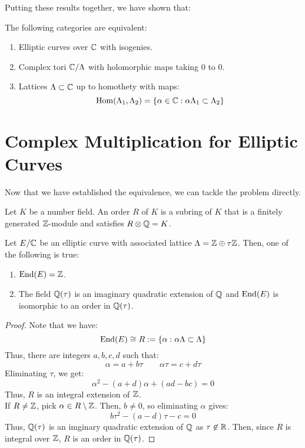 \documentclass[12pt]{article}
\begin{document}
Putting these results together, we have shown that:

\begin{theorem}
    The following categories are equivalent: 
    \begin{enumerate}
        \item Elliptic curves over $\mathbb C$ with isogenies.
        \item Complex tori $\mathbb C/\Lambda$ with holomorphic maps taking $0$ to $0$. 
        \item Lattices $\Lambda \subset \mathbb C$ up to homothety with maps:
        \[ \operatorname{Hom}(\Lambda_1, \Lambda_2) = \{\alpha \in \mathbb C: \alpha \Lambda_1 \subset \Lambda_2\}\]
    \end{enumerate}
\end{theorem}


\section{Complex Multiplication for Elliptic Curves}

Now that we have established the equivalence, we can tackle the problem directly.
\begin{definition}
    Let $K$ be a number field. An order $R$ of $K$ is a subring of $K$ that is a finitely generated $\mathbb Z$-module and satisfies $R \otimes \mathbb Q = K$. 
\end{definition}

\begin{prop}
    Let $E/\mathbb C$ be an elliptic curve with associated lattice $\Lambda = \mathbb Z \oplus \tau\mathbb Z$. Then, one of the following is true:
    \begin{enumerate}
        \item $\operatorname{End}(E) = \mathbb Z$. 
        \item The field $\mathbb Q(\tau)$ is an imaginary quadratic extension of $\mathbb Q$ and $\operatorname{End}(E)$ is isomorphic to an order in $\mathbb Q(\tau)$. 
    \end{enumerate}
\end{prop}
\begin{proof}
    Note that we have:
    \[ \operatorname{End}(E) \cong R := \{\alpha: \alpha \Lambda \subset \Lambda\}\]
    Thus, there are integers $a, b, c, d$ such that:
    \[ \alpha = a + b \tau \qquad \alpha\tau = c+d\tau\]
    Eliminating $\tau$, we get: 
    \[\alpha^2 - (a+d)\alpha + (ad-bc) = 0\]
    Thus, $R$ is an integral extension of $\mathbb Z$. \\
    If $R \ne \mathbb Z$, pick $\alpha \in R\setminus \mathbb Z$. Then, $b \neq 0$, so eliminating $\alpha$ gives: 
    \[ b\tau^2 - (a-d)\tau -c = 0\]
    Thus, $\mathbb Q(\tau)$ is an imginary quadratic extension of $\mathbb Q$ as $\tau \not \in \mathbb R$. Then, since $R$ is integral over $\mathbb Z$, $R$ is an order in $\mathbb Q(\tau)$.
\end{proof}
\end{document}
